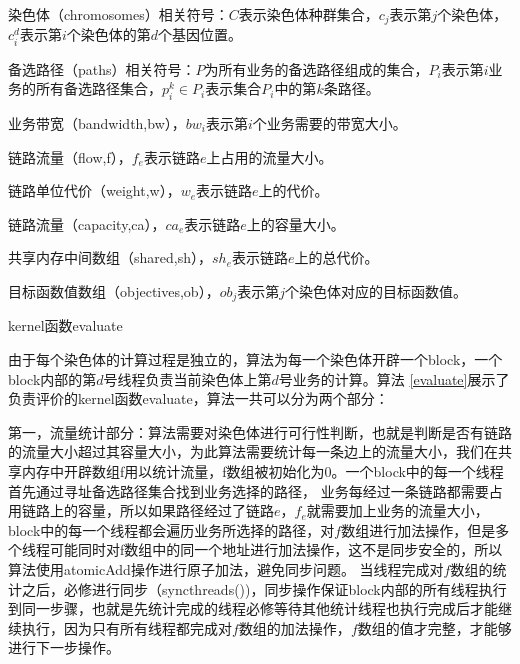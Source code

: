染色体（chromosomes）相关符号：$C$表示染色体种群集合，$c_j$表示第$j$个染色体，$c^d_i$表示第$i$个染色体的第$d$个基因位置。

备选路径（paths）相关符号：$P$为所有业务的备选路径组成的集合，$P_i$表示第$i$业务的所有备选路径集合，$p_i^k \in P_i$表示集合$P_i$中的第$k$条路径。

业务带宽（bandwidth,bw），$bw_i$表示第$i$个业务需要的带宽大小。

链路流量（flow,f），$f_e$表示链路$e$上占用的流量大小。

链路单位代价（weight,w），$w_e$表示链路$e$上的代价。

链路流量（capacity,ca），$ca_e$表示链路$e$上的容量大小。

共享内存中间数组（shared,sh），$sh_e$表示链路$e$上的总代价。

目标函数值数组（objectives,ob），$ob_j$表示第$j$个染色体对应的目标函数值。

\begin{algorithm}[t]
\begin{algorithmic}[1]
\EndFor
{}
\Else
{}
\EndIf
{}
\EndIf
{}
\EndWhile
{}
\EndFunction
\end{algorithmic}
\caption{kernel函数evaluate}
\label{evaluate}
\end{algorithm}

由于每个染色体的计算过程是独立的，算法为每一个染色体开辟一个block，一个block内部的第$d$号线程负责当前染色体上第$d$号业务的计算。算法 \ref{evaluate}展示了负责评价的kernel函数evaluate，算法一共可以分为两个部分：

第一，流量统计部分：算法需要对染色体进行可行性判断，也就是判断是否有链路的流量大小超过其容量大小，为此算法需要统计每一条边上的流量大小，我们在共享内存中开辟数组f用以统计流量，f数组被初始化为0。一个block中的每一个线程首先通过寻址备选路径集合找到业务选择的路径，
业务每经过一条链路都需要占用链路上的容量，所以如果路径经过了链路$e$，$f_e$就需要加上业务的流量大小，block中的每一个线程都会遍历业务所选择的路径，对$f$数组进行加法操作，但是多个线程可能同时对f数组中的同一个地址进行加法操作，这不是同步安全的，所以算法使用atomicAdd操作进行原子加法，避免同步问题。
当线程完成对$f$数组的统计之后，必修进行同步（syncthreads())，同步操作保证block内部的所有线程执行到同一步骤，也就是先统计完成的线程必修等待其他统计线程也执行完成后才能继续执行，因为只有所有线程都完成对$f$数组的加法操作，$f$数组的值才完整，才能够进行下一步操作。


